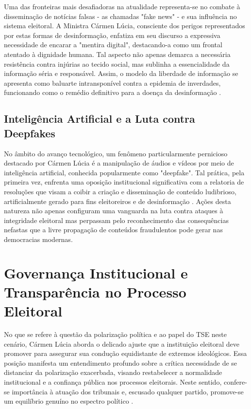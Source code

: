 \documentclass[
   article,       
   12pt,          
   oneside,       
   a4paper,       
   english,       
   brazil,        
   sumario=tradicional
   ]{abntex2}
\begin{document}
Uma das fronteiras mais desafiadoras na atualidade representa-se no combate à disseminação de notícias falsas - as chamadas "fake news" - e sua influência no sistema eleitoral. A Ministra Cármen Lúcia, consciente dos perigos representados por estas formas de desinformação, enfatiza em seu discurso a expressiva necessidade de encarar a "mentira digital", destacando-a como um frontal atentado à dignidade humana. Tal aspecto não apenas demarca a necessária resistência contra injúrias ao tecido social, mas sublinha a essencialidade da informação séria e responsável. Assim, o modelo da liberdade de informação se apresenta como baluarte intransponível contra a epidemia de inverdades, funcionando como o remédio definitivo para a doença da desinformação \cite{Contra_o_virus_da_mentira_ha_o_remedio_da_inf}.

\subsection{Inteligência Artificial e a Luta contra Deepfakes}

No âmbito do avanço tecnológico, um fenômeno particularmente pernicioso destacado por Cármen Lúcia é a manipulação de áudios e vídeos por meio de inteligência artificial, conhecida popularmente como "deepfake". Tal prática, pela primeira vez, enfrenta uma oposição institucional significativa com a relatoria de resoluções que visam a coibir a criação e disseminação de conteúdo ludibrioso, artificialmente gerado para fins eleitoreiros e de desinformação \cite{Carmen_Lucia_toma_posse_na_presidencia_do_TSE}. Ações desta natureza não apenas configuram uma vanguarda na luta contra ataques à integridade eleitoral mas perpassam pelo reconhecimento das consequências nefastas que a livre propagação de conteúdos fraudulentos pode gerar nas democracias modernas.

\section{Governança Institucional e Transparência no Processo Eleitoral}

No que se refere à questão da polarização política e ao papel do TSE neste cenário, Cármen Lúcia aborda o delicado ajuste que a instituição eleitoral deve promover para assegurar sua condução equidistante de extremos ideológicos. Essa posição manifesta um entendimento profundo sobre a crítica necessidade de se distanciar da polarização exacerbada, visando restabelecer a normalidade institucional e a confiança pública nos processos eleitorais. Neste sentido, confere-se importância à atuação dos tribunais e, escusado qualquer partido, promove-se um equilíbrio genuíno no espectro político \cite{Carmen_Lucia_tem_de_afastar_TSE_da_polarizaca}.
\end{document}
